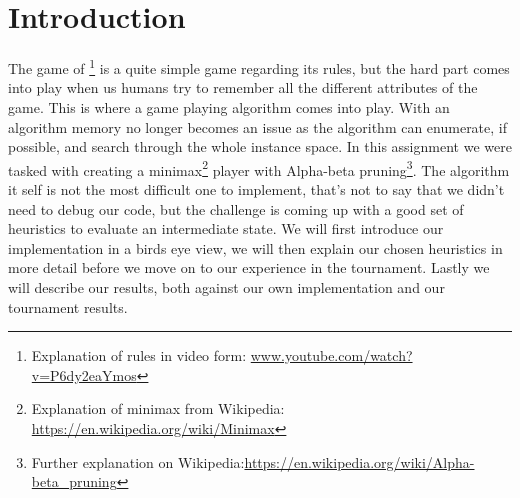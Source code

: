 \section{Introduction}\label{intro}
The game of \quarto{}\footnote{Explanation of rules in video form: 
\url{www.youtube.com/watch?v=P6dy2eaYmos}}
is a quite simple game regarding its rules, but the hard part
comes into play when us humans try to remember all the different attributes of the game. This is where a game playing algorithm comes into play. With an algorithm memory no longer becomes an issue as the algorithm can enumerate, if possible, and search through the whole instance space. In this assignment
we were tasked with creating a minimax\footnote{Explanation of minimax from Wikipedia: \url{https://en.wikipedia.org/wiki/Minimax}} player with Alpha-beta pruning\footnote{ Further explanation on Wikipedia:\url{https://en.wikipedia.org/wiki/Alpha-beta_pruning}}.
The algorithm it self is not the most difficult one to implement, that's not to say that we didn't need to debug our code, but the challenge is coming up with a good set of heuristics to evaluate an intermediate state. We will first introduce our implementation in a birds eye view, we will then explain our chosen heuristics in more detail before we move on to our experience in the tournament. Lastly we will describe our results, both against our own implementation and our tournament results.
